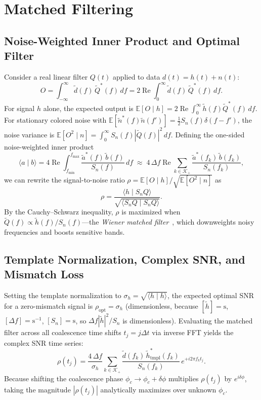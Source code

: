 \documentclass[11pt,a4paper]{report}
\begin{document}
\chapter{Matched Filtering}\label{ch:matched_filter}

\section{Noise-Weighted Inner Product and Optimal Filter}
Consider a real linear filter $Q(t)$ applied to data $d(t) = h(t) + n(t)$:
\begin{equation}
O = \int_{-\infty}^{\infty} \tilde{d}(f)\,\tilde{Q}^*(f)\,df = 2\operatorname{Re}\int_0^{\infty} \tilde{d}(f)\,\tilde{Q}^*(f)\,df.
\end{equation}
For signal $h$ alone, the expected output is $\mathbb{E}[O \mid h] = 2\operatorname{Re}\int_0^\infty \tilde{h}(f)\tilde{Q}^*(f)\,df$. For stationary colored noise with $\mathbb{E}[\tilde{n}^*(f)\tilde{n}(f')] = \frac{1}{2}S_n(f)\delta(f-f')$, the noise variance is $\mathbb{E}[O^2 \mid n] = \int_0^\infty S_n(f)|\tilde{Q}(f)|^2\,df$. Defining the one-sided noise-weighted inner product
\begin{equation}
\langle a \mid b \rangle = 4\operatorname{Re}\int_{f_{\min}}^{f_{\max}} \frac{\tilde{a}^*(f)\,\tilde{b}(f)}{S_n(f)}\,df \;\approx\; 4\,\Delta f \operatorname{Re}\sum_{k \in \mathcal{K}_+} \frac{\tilde{a}^*(f_k)\,\tilde{b}(f_k)}{S_n(f_k)},
\end{equation}
we can rewrite the signal-to-noise ratio $\rho = \mathbb{E}[O \mid h] / \sqrt{\mathbb{E}[O^2 \mid n]}$ as
\begin{equation}
\rho = \frac{\langle h \mid S_n Q \rangle}{\sqrt{\langle S_n Q \mid S_n Q \rangle}}.
\end{equation}
By the Cauchy--Schwarz inequality, $\rho$ is maximized when $\tilde{Q}(f) \propto \tilde{h}(f) / S_n(f)$---the \emph{Wiener matched filter}~\cite{Allen2012}, which downweights noisy frequencies and boosts sensitive bands.

\section{Template Normalization, Complex SNR, and Mismatch Loss}
Setting the template normalization to $\sigma_h = \sqrt{\langle h \mid h \rangle}$, the expected optimal SNR for a zero-mismatch signal is $\rho_{\mathrm{opt}} = \sigma_h$ (dimensionless, because $[\tilde{h}] = \mathrm{s}$, $[\Delta f] = \mathrm{s}^{-1}$, $[S_n] = \mathrm{s}$, so $\Delta f |\tilde{h}|^2 / S_n$ is dimensionless). Evaluating the matched filter across all coalescence time shifts $t_j = j\Delta t$ via inverse FFT yields the complex SNR time series:
\begin{equation}
\rho(t_j) = \frac{4\,\Delta f}{\sigma_h} \sum_{k \in \mathcal{K}_+} \frac{\tilde{d}(f_k)\,\tilde{h}_{\mathrm{tmpl}}^*(f_k)}{S_n(f_k)}\,e^{+i 2\pi f_k t_j}.
\end{equation}
Because shifting the coalescence phase $\phi_c \to \phi_c + \delta\phi$ multiplies $\rho(t_j)$ by $e^{i\delta\phi}$, taking the magnitude $|\rho(t_j)|$ analytically maximizes over unknown $\phi_c$.
\end{document}
